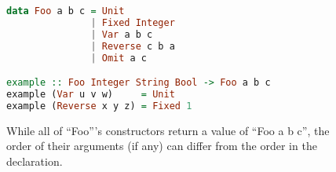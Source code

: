 \begin{figure}
    \centering
    \begin{lstlisting}[language=Haskell]
data Foo a b c = Unit
               | Fixed Integer
               | Var a b c
               | Reverse c b a
               | Omit a c

example :: Foo Integer String Bool -> Foo a b c
example (Var u v w)     = Unit
example (Reverse x y z) = Fixed 1
\end{lstlisting}
    \caption{While all of ``Foo'''s constructors return a value of ``Foo a b c'', the order of their arguments (if any) can differ from the order in the declaration.}
    \label{fig:datatype}
\end{figure}